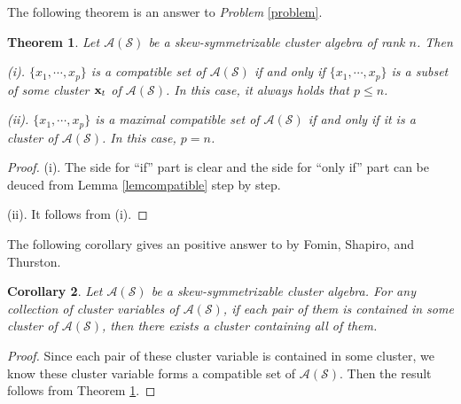 \documentclass[14pt]{amsart}
\newtheorem{Theorem}{Theorem}[section]
\newtheorem{Corollary}[Theorem]{Corollary}
\begin{document}
The following theorem is an answer to {\em Problem} \ref{problem}.

\begin{Theorem}\label{thmcompatible}
Let $\mathcal A(\mathcal S)$ be a skew-symmetrizable cluster algebra of rank $n$. Then

(i).  $\{x_1,\cdots,x_p\}$ is  a compatible set of $\mathcal A(\mathcal S)$ if and only if  $\{x_1,\cdots,x_p\}$ is a subset of some cluster ${\bf x}_t$ of $\mathcal A(\mathcal S)$.  In this case, it always holds that $p\leq n$.

(ii). $\{x_1,\cdots,x_p\}$ is a  maximal compatible set of $\mathcal A(\mathcal S)$  if and only if it is a cluster of $\mathcal A(\mathcal S)$. In this case, $p=n$.
\end{Theorem}
\begin{proof}
(i). The side for ``if'' part is clear and the side for ``only if'' part can be deuced from Lemma \ref{lemcompatible} step by step.

(ii). It follows from (i).
\end{proof}

The following corollary gives an positive answer to \cite[Conjecture 5.5]{FST} by Fomin,  Shapiro, and  Thurston.
\begin{Corollary}
Let $\mathcal A(\mathcal S)$ be a skew-symmetrizable cluster algebra. For any collection of cluster variables of $\mathcal A(\mathcal S)$, if each pair of them is contained in some cluster of $\mathcal A(\mathcal S)$, then there exists a cluster containing all of them.
\end{Corollary}
\begin{proof}
Since  each pair of these cluster variable is contained in some cluster, we know these cluster variable forms a compatible set of  $\mathcal A(\mathcal S)$. Then the result follows from Theorem \ref{thmcompatible}.
\end{proof}
\end{document}

